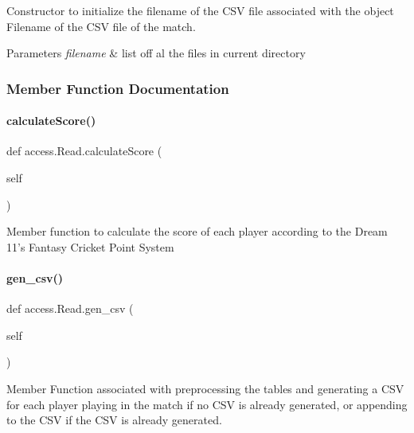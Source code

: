 Constructor to initialize the filename of the C\+SV file associated with the object Filename of the C\+SV file of the match. 

\textquotesingle{}
\begin{DoxyParams}{Parameters}
{\em filename} & list off al the files in current directory \\
\hline
\end{DoxyParams}


\subsubsection{Member Function Documentation}
\mbox{\label{classaccess_1_1Read_a428ebf658bf3d2c447840ac58ef9f406}} 
\paragraph{\texorpdfstring{calculate\+Score()}{calculateScore()}}
{\footnotesize\ttfamily def access.\+Read.\+calculate\+Score (\begin{DoxyParamCaption}\item[{}]{self }\end{DoxyParamCaption})}

\begin{DoxyVerb}Member function to calculate the score of each player according to the Dream 11's Fantasy Cricket Point System
\end{DoxyVerb}
 \mbox{\label{classaccess_1_1Read_a9fbc3733d085156a8ee1ac59327483d1}} 
\paragraph{\texorpdfstring{gen\+\_\+csv()}{gen\_csv()}}
{\footnotesize\ttfamily def access.\+Read.\+gen\+\_\+csv (\begin{DoxyParamCaption}\item[{}]{self }\end{DoxyParamCaption})}

\begin{DoxyVerb}Member Function associated with preprocessing the tables and generating a CSV for each player playing in the match if no CSV is already generated, or appending to the CSV if the CSV is already generated.\end{DoxyVerb}
 \mbox{\label{classaccess_1_1Read_af9ec59006c0081393da1c4e3d8842208}} 

